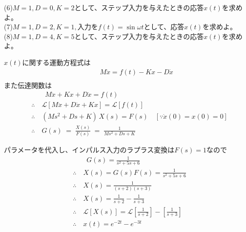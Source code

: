 \documentclass[a4paper,12pt]{article}
\begin{document}
\indent
(6)\(M=1,D=0,K=2\)として、ステップ入力を与えたときの応答\(x(t)\)を求めよ。\\

\indent
(7)\(M=1,D=2,K=1,\)入力を\(f(t)=\sin \omega t\)として、応答\(x(t)\)を求めよ。\\

\indent
(8)\(M=1,D=4,K=5\)として、ステップ入力を与えたときの応答\(x(t)\)を求めよ。\\
\begin{tcolorbox}[title={4. (1) 上図によって示されるシステムの運動方程式ならびに伝達関数を求めよ。}]
    \(x(t)\)に関する運動方程式は
    \begin{align*}
        &\qquad M\ddot{x} =f(t) -Kx - D \dot{x} \\
    \end{align*}
    また伝達関数は
    \begin{align*}
        &\qquad M\ddot{x} + Kx + D \dot{x} =f(t) \\
        &\therefore \quad \mathcal{L} \left[ M\ddot{x} + D \dot{x} + Kx\right] 
        =\mathcal{L} \left[ f(t) \right] \\
        &\therefore \quad (M s^2 + D s + K)\,X(s) = F(s) \quad [\because \dot{x}(0)=x(0)=0 ]\\
        &\therefore \quad G(s) \;=\;\frac{X(s)}{F(s)}
        \;=\;\frac{1}{M s^2 + D s + K}
    \end{align*}
    
\end{tcolorbox}

\begin{tcolorbox}[title={4. (2) 各パラメータを\(M=1,D=5,K=6\)として、インパルス応答を求めよ。}]
     パラメータを代入し、インパルス入力のラプラス変換は\(F(s)=1\)なので
     \vspace{-2mm}
     \begin{align*}
        &\qquad G(s) = \frac{1}{s^2 + 5s + 6} \\
        &\therefore \quad X(s) = G(s) F(s) = \frac{1}{s^2 + 5s + 6}\\
        &\therefore \quad X(s) = \frac{1}{(s+2)(s+3)}\\
        &\therefore \quad X(s) = \frac{1}{s+2} - \frac{1}{s+3}\\
        &\therefore \quad \mathcal{L} \left[ X(s)\right] 
        =\mathcal{L} \left[ \frac{1}{s+2}\right] - \left[\frac{1}{s+3}  \right] \\
        &\therefore \quad x(t) = e^{-2t} - e^{-3t}
    \end{align*}
\end{tcolorbox}
\end{document}
